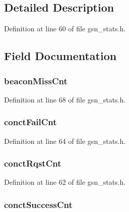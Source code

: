 \subsection{Detailed Description}


Definition at line 60 of file gsn\_\-stats.h.



\subsection{Field Documentation}
\hypertarget{a00301_a00a24b43af4dd333f89259b25ed7aaef}{
\subsubsection[{beaconMissCnt}]{ {\bf beaconMissCnt}}}
\label{a00301_a00a24b43af4dd333f89259b25ed7aaef}


Definition at line 68 of file gsn\_\-stats.h.

\hypertarget{a00301_a15ff019dfbe98340d6dcd15155c3b53c}{
\subsubsection[{conctFailCnt}]{ {\bf conctFailCnt}}}
\label{a00301_a15ff019dfbe98340d6dcd15155c3b53c}


Definition at line 64 of file gsn\_\-stats.h.

\hypertarget{a00301_a3d46a252d29d27f41d12d517af34da1c}{
\subsubsection[{conctRqstCnt}]{ {\bf conctRqstCnt}}}
\label{a00301_a3d46a252d29d27f41d12d517af34da1c}


Definition at line 62 of file gsn\_\-stats.h.

\hypertarget{a00301_a9bbf8d7d7248d76b305feea88cdb0bc1}{
\subsubsection[{conctSuccessCnt}]{ {\bf conctSuccessCnt}}}
\label{a00301_a9bbf8d7d7248d76b305feea88cdb0bc1}


